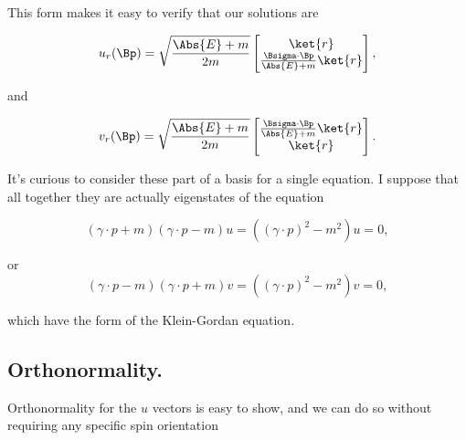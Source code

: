 This form makes it easy to verify that our solutions are

\begin{equation}\label{eqn:desaiDiracAdjoint:30a}
u_r(\Bp) =
\sqrt{\frac{\Abs{E} + m}{2m}}
\begin{bmatrix}
\ket{r} \\
\frac{\Bsigma \cdot \Bp}{\Abs{E} + m} \ket{r}
\end{bmatrix},
\end{equation}

and

\begin{equation}\label{eqn:desaiDiracAdjoint:50a}
v_r(\Bp) =
\sqrt{\frac{\Abs{E} + m}{2m}}
\begin{bmatrix}
\frac{\Bsigma \cdot \Bp}{\Abs{E} + m} \ket{r} \\
\ket{r} \\
\end{bmatrix}.
\end{equation}

It's curious to consider these part of a basis for a single equation.  I suppose that all together they are actually eigenstates of the equation

\begin{equation}\label{eqn:desaiDiracAdjoint:500}
(\gamma \cdot p + m) (\gamma \cdot p - m) u = ((\gamma \cdot p)^2 - m^2) u = 0,
\end{equation}

or
\begin{equation}\label{eqn:desaiDiracAdjoint:520}
(\gamma \cdot p - m) (\gamma \cdot p + m) v = ((\gamma \cdot p)^2 - m^2) v = 0,
\end{equation}

which have the form of the Klein-Gordan equation.

\subsection{Orthonormality.}

Orthonormality for the $u$ vectors is easy to show, and we can do so without requiring any specific spin orientation

